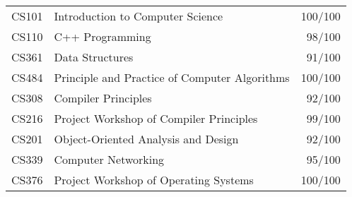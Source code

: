 \documentclass[letterpaper]{article}
\begin{document}
\begin{tabular}{clr}
  CS101 & Introduction to Computer Science & 100/100 \\
  CS110 & C++ Programming & 98/100 \\
  CS361 & Data Structures & 91/100 \\
  CS484 & Principle and Practice of Computer Algorithms & 100/100 \\
  CS308 & Compiler Principles & 92/100 \\
  CS216 & Project Workshop of Compiler Principles & 99/100 \\
  CS201 & Object-Oriented Analysis and Design & 92/100 \\
  CS339 & Computer Networking & 95/100 \\
  CS376 & Project Workshop of Operating Systems & 100/100
\end{tabular}
\end{document}
